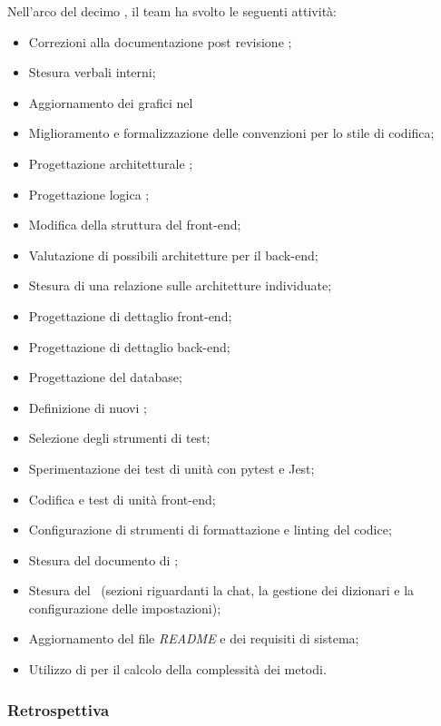 Nell'arco del decimo , il team ha svolto le seguenti attività:
\begin{itemize}
  \item Correzioni alla documentazione post revisione ;
  \item Stesura verbali interni;
  \item Aggiornamento dei grafici nel \PdQ\;
  \item Miglioramento e formalizzazione delle convenzioni per lo stile di codifica;
  \item Progettazione architetturale ;
  \item Progettazione logica ;
  \item Modifica della struttura del front-end;
  \item Valutazione di possibili architetture per il back-end;
  \item Stesura di una relazione sulle architetture individuate;
  \item Progettazione di dettaglio front-end;
  \item Progettazione di dettaglio back-end;
  \item Progettazione del database;
  \item Definizione di nuovi ;
  \item Selezione degli strumenti di test;
  \item Sperimentazione dei test di unità con pytest e Jest;
  \item Codifica e test di unità front-end;
  \item Configurazione di strumenti di formattazione e linting del codice;
  \item Stesura del documento di \ST;
  \item Stesura del \MU\ (sezioni riguardanti la chat, la gestione dei dizionari e la configurazione delle impostazioni);
  \item Aggiornamento del file \textit{README} e dei requisiti di sistema;
  \item Utilizzo di  per il calcolo della complessità dei metodi.
\end{itemize}

\subsubsection{Retrospettiva}

